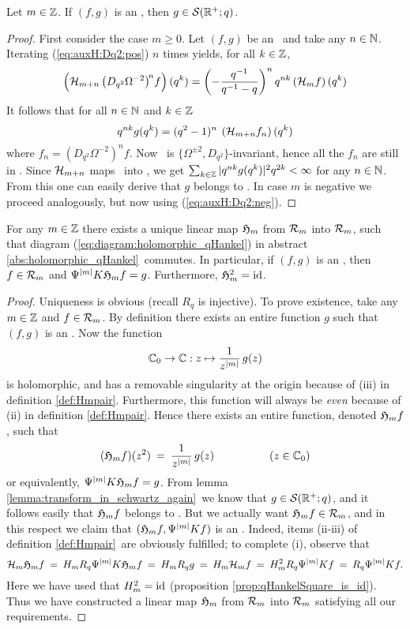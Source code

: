 \begin{lemma} \label{lemma:transform_in_schwartz_again}
Let $m\in\mathbb{Z}$. If $(f,g)$ is an \Hmpair, then $g\in {\mathcal S}(\mathbb{R}^+;q)$.
\end{lemma}
\begin{proof}
First consider the case $m\geq 0$.
Let $(f,g)$ be an \Hmpair\ and take any $n\in \mathbb{N}$.
Iterating (\ref{eq:auxH:Dq2:pos}) $n$ times yields, for all $k\in \mathbb{Z}$,
$$ \left({\mathcal H}_{m+n} \left(D_{q^2} \Omega^{-2}\right)^{\! n} \! f\right)(q^k)
      = \left(-\frac{q^{-1}}{q^{-1}-q}\right)^n  q^{nk} \left({\mathcal H}_{m}f\right)(q^k) $$
It follows that for all $n\in \mathbb{N}$ and $k\in \mathbb{Z}$
$$ q^{nk} g(q^k) = (q^2-1)^n \:\left({\mathcal H}_{m+n} f_n\right)(q^k) $$
where $f_n=(D_{q^2} \Omega^{-2})^n \! f$.
Now \Swqbis\ is $\{\Omega^{\pm 2}, D_{q^2} \}$-invariant,
hence all the $f_n$ are still in \Swqbis\@. Since ${\mathcal H}_{m+n}$
maps \Swqbis\ into \Ltwoq, we get
$\sum_{k\in\mathbb{Z}} |q^{nk}g(q^k)|^2 q^{2k} < \infty$ for any $n\in \mathbb{N}$.
From this one can easily derive that $g$ belongs to \Swq\@.
In case $m$ is negative we proceed analogously, but now using (\ref{eq:auxH:Dq2:neg}).
\end{proof}


\begin{prop} \label{prop:exist:holomorphic_qHankel}
For any $m\in\mathbb{Z}$ there exists a unique linear map
$\mathfrak{H}_{m}$ from ${\mathcal R}_{m}$ into ${\mathcal R}_{m}$,
such that diagram (\ref{eq:diagram:holomorphic_qHankel})
in abstract \ref{abs:holomorphic_qHankel}\ commutes.
In particular, if $(f,g)$ is an \Hmpair, then $f\in{\mathcal R}_{m}$ and
$\Psi^{|m|} K \mathfrak{H}_{m}f =g$. Furthermore, $\mathfrak{H}_{m}^2=\mbox{\rm id}$.
\end{prop}
\begin{proof}
Uniqueness is obvious (recall $R_q$ is injective). To prove existence,
take any $m\in\mathbb{Z}$ and $f \in{\mathcal R}_{m}$. By definition there exists
an entire function $g$ such that $(f,g)$ is an \Hmpair\@.
Now the function
$$ \mathbb{C}_0 \rightarrow \mathbb{C} : z \mapsto \frac{1}{z^{|m|}}\, g(z)$$
is holomorphic, and has a removable singularity at the origin because
of (iii) in definition \ref{def:Hmpair}\@.
Furthermore, this function will always be {\em even\/} because of (ii)
in definition \ref{def:Hmpair}\@.
Hence there exists an entire function, denoted $\mathfrak{H}_{m}f$, such that
$$ (\mathfrak{H}_{m}f)(z^2)\: =\: \frac{1}{z^{|m|}}\, g(z) \hspace{5em} (z\in \mathbb{C}_0) $$
or equivalently, $\Psi^{|m|} K \mathfrak{H}_{m}f = g$.
From lemma \ref{lemma:transform_in_schwartz_again}\ we know that $g\in {\mathcal S}(\mathbb{R}^+;q)$,
and it follows easily that $\mathfrak{H}_{m}f$ belongs to \Swqbis\@.
But we actually want $\mathfrak{H}_{m}f\in {\mathcal R}_{m}$, and
in this respect we claim that $(\mathfrak{H}_{m}f, \Psi^{|m|} K f)$ is an \Hmpair\@.
Indeed, items (ii-iii) of definition \ref{def:Hmpair}\ are
obviously fulfilled; to complete (i), observe that
$$ {\mathcal H}_{m} \mathfrak{H}_{m} f \:=\: H_m R_q \Psi^{|m|} K \mathfrak{H}_{m} f  \:=\: H_m R_q g
   \:=\: H_m {\mathcal H}_{m} f \:=\: H_m^2 R_q \Psi^{|m|} K f  \:=\: R_q \Psi^{|m|} K f. $$
Here we have used that $H_m^2=\mbox{\rm id}$ (proposition \ref{prop:qHankelSquare_is_id}).
Thus we have constructed a linear map $\mathfrak{H}_{m}$ from ${\mathcal R}_{m}$ into
${\mathcal R}_{m}$ satisfying all our requirements.
\end{proof}


